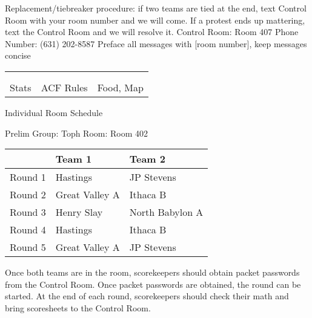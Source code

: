 \documentclass{article}%
\begin{document}
\newline%
Replacement/tiebreaker procedure: if two teams are tied at the end, text Control Room with your room number and we will come. If a protest ends up mattering, text the Control Room and we will resolve it.\newline%
\newline%
Control Room: Room 407\newline%
Phone Number: (631) 202{-}8587\newline%
Preface all messages with {[}room number{]}, keep messages concise%
\vspace*{30pt}%
\newline%
%
\begin{tabularx}{\textwidth}{YYY}%
  &  &  \\%
\\%
Stats&ACF Rules&Food, Map\\%
\end{tabularx}%
\newpage%
\begin{center}%
\begin{Huge}%
Individual Room Schedule%
\end{Huge}%
\vspace*{16pt}%
\linebreak%
\begin{Large}%
Prelim Group: Toph \hfill Room: Room 402%
\end{Large}%
\end{center}%
%
\begin{tabularx}{\textwidth}{|c|Y|Y|}%
\hline%
&Team 1&Team 2\\%
\hline%
Round 1&Hastings&JP Stevens\\%
Round 2&Great Valley A&Ithaca B\\%
Round 3&Henry Slay&North Babylon A\\%
Round 4&Hastings&Ithaca B\\%
Round 5&Great Valley A&JP Stevens\\%
\hline%
\end{tabularx}%
\vspace*{16pt}%
\linebreak%
Once both teams are in the room, scorekeepers should obtain packet passwords from the Control Room. Once packet passwords are obtained, the round can be started. At the end of each round, scorekeepers should check their math and bring scoresheets to the Control Room.\newline%
\end{document}
